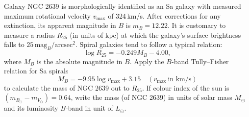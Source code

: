 Galaxy NGC 2639 is morphologically identified as an Sa galaxy with measured
maximum rotational velocity $v_{\max}$ of 324\,km/s. After corrections for any
extinction, its apparent magnitude in $B$ is $m_B = 12.22$. It is customary to
measure a radius $R_{25}$ (in units of kpc) at which the galaxy's surface
brightness falls to $25\,\mathrm{mag}_B/\mathrm{arcsec}^2$. Spiral galaxies
tend to follow a typical relation:
\[ \log R_{25} = -0.249 M_B - 4.00, \]
where $M_B$ is the absolute magnitude in $B$. Apply the $B$-band Tully--Fisher
relation for Sa spirals
\[ M_B = -9.95 \log v_{\max} + 3.15 \quad (v_{\max}\ \text{in km/s}) \]
to calculate the mass of NGC 2639 out to $R_{25}$. If colour index of the sun
is $(m_{B_\odot} - m_{V_\odot}) = 0.64$, write the mass (of NGC 2639) in units
of solar mass $M_\odot$ and its luminosity $B$-band in unit of $L_\odot$.
